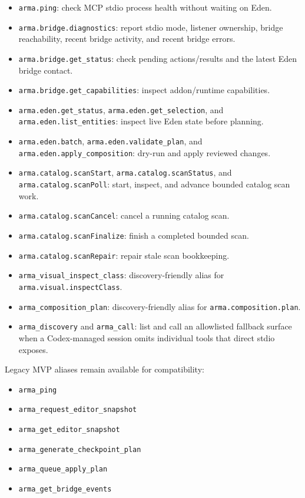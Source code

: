 \documentclass[11pt]{article}
\newcommand{\code}[1]{\texttt{#1}}
\begin{document}
\begin{itemize}
  \item \code{arma.ping}: check MCP stdio process health without waiting on Eden.
  \item \code{arma.bridge.diagnostics}: report stdio mode, listener ownership,
        bridge reachability, recent bridge activity, and recent bridge errors.
  \item \code{arma.bridge.get\_status}: check pending actions/results and the
        latest Eden bridge contact.
  \item \code{arma.bridge.get\_capabilities}: inspect addon/runtime capabilities.
  \item \code{arma.eden.get\_status}, \code{arma.eden.get\_selection}, and
        \code{arma.eden.list\_entities}: inspect live Eden state before planning.
  \item \code{arma.eden.batch}, \code{arma.eden.validate\_plan}, and
        \code{arma.eden.apply\_composition}: dry-run and apply reviewed changes.
  \item \code{arma.catalog.scanStart}, \code{arma.catalog.scanStatus}, and
        \code{arma.catalog.scanPoll}: start, inspect, and advance bounded
        catalog scan work.
  \item \code{arma.catalog.scanCancel}: cancel a running catalog scan.
  \item \code{arma.catalog.scanFinalize}: finish a completed bounded scan.
  \item \code{arma.catalog.scanRepair}: repair stale scan bookkeeping.
  \item \code{arma\_visual\_inspect\_class}: discovery-friendly alias for
        \code{arma.visual.inspectClass}.
  \item \code{arma\_composition\_plan}: discovery-friendly alias for
        \code{arma.composition.plan}.
  \item \code{arma\_discovery} and \code{arma\_call}: list and call an
        allowlisted fallback surface when a Codex-managed session omits
        individual tools that direct stdio exposes.
\end{itemize}

Legacy MVP aliases remain available for compatibility:

\begin{itemize}
  \item \code{arma\_ping}
  \item \code{arma\_request\_editor\_snapshot}
  \item \code{arma\_get\_editor\_snapshot}
  \item \code{arma\_generate\_checkpoint\_plan}
  \item \code{arma\_queue\_apply\_plan}
  \item \code{arma\_get\_bridge\_events}
\end{itemize}
\end{document}
